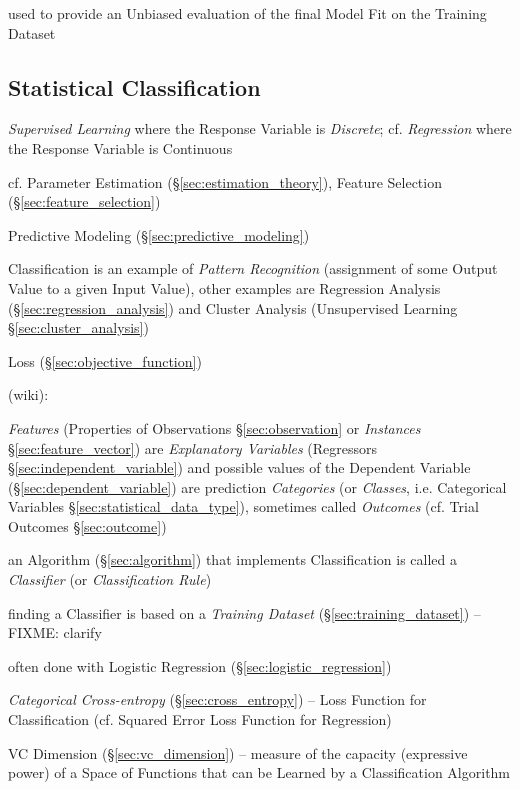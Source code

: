 used to provide an Unbiased evaluation of the final Model Fit on the Training
Dataset



\subsection{Statistical Classification}\label{sec:classification}

\emph{Supervised Learning} where the Response Variable is \emph{Discrete}; cf.
\emph{Regression} where the Response Variable is Continuous

cf. Parameter Estimation (\S\ref{sec:estimation_theory}), Feature Selection
(\S\ref{sec:feature_selection})

\fist Predictive Modeling (\S\ref{sec:predictive_modeling})

Classification is an example of \emph{Pattern Recognition} (assignment of some
Output Value to a given Input Value), other examples are Regression Analysis
(\S\ref{sec:regression_analysis}) and Cluster Analysis (Unsupervised Learning
\S\ref{sec:cluster_analysis})

Loss (\S\ref{sec:objective_function})

(wiki):

\emph{Features} (Properties of Observations \S\ref{sec:observation} or
\emph{Instances} \S\ref{sec:feature_vector}) are \emph{Explanatory Variables}
(Regressors \S\ref{sec:independent_variable}) and possible values of the
Dependent Variable (\S\ref{sec:dependent_variable}) are prediction
\emph{Categories} (or \emph{Classes}, i.e. Categorical Variables
\S\ref{sec:statistical_data_type}), sometimes called \emph{Outcomes} (cf. Trial
Outcomes \S\ref{sec:outcome})

an Algorithm (\S\ref{sec:algorithm}) that implements Classification is called a
\emph{Classifier} (or \emph{Classification Rule})

finding a Classifier is based on a \emph{Training Dataset}
(\S\ref{sec:training_dataset}) --FIXME: clarify

often done with Logistic Regression (\S\ref{sec:logistic_regression})

\emph{Categorical Cross-entropy} (\S\ref{sec:cross_entropy}) -- Loss Function
for Classification (cf. Squared Error Loss Function for Regression)

\fist VC Dimension (\S\ref{sec:vc_dimension}) -- measure of the capacity
(expressive power) of a Space of Functions that can be Learned by a
Classification Algorithm

